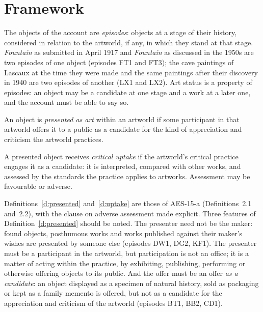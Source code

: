 \documentclass{situationist-preprint}
\begin{document}
\section{Framework}\label{s:framework}

The objects of the account are \emph{episodes}: objects at a stage of their history, considered in relation to the artworld, if any, in which they stand at that stage. \emph{Fountain} as submitted in April 1917 and \emph{Fountain} as discussed in the 1950s are two episodes of one object (episodes FT1 and FT3); the cave paintings of Lascaux at the time they were made and the same paintings after their discovery in 1940 are two episodes of another (LX1 and LX2). Art status is a property of episodes: an object may be a candidate at one stage and a work at a later one, and the account must be able to say so.

\begin{definition}[Presentation]\label{d:presented}
An object is \emph{presented as art} within an artworld if some participant in that artworld offers it to a public as a candidate for the kind of appreciation and criticism the artworld practices.
\end{definition}

\begin{definition}\label{d:uptake}
A presented object receives \emph{critical uptake} if the artworld's critical practice engages it as a candidate: it is interpreted, compared with other works, and assessed by the standards the practice applies to artworks. Assessment may be favourable or adverse.
\end{definition}

Definitions~\ref{d:presented} and~\ref{d:uptake} are those of AES-15-a (Definitions~2.1 and~2.2), with the clause on adverse assessment made explicit. Three features of Definition~\ref{d:presented} should be noted. The presenter need not be the maker: found objects, posthumous works and works published against their maker's wishes are presented by someone else (episodes DW1, DG2, KF1). The presenter must be a participant in the artworld, but participation is not an office; it is a matter of acting within the practice, by exhibiting, publishing, performing or otherwise offering objects to its public. And the offer must be an offer \emph{as a candidate}: an object displayed as a specimen of natural history, sold as packaging or kept as a family memento is offered, but not as a candidate for the appreciation and criticism of the artworld (episodes BT1, BB2, CD1).
\end{document}
